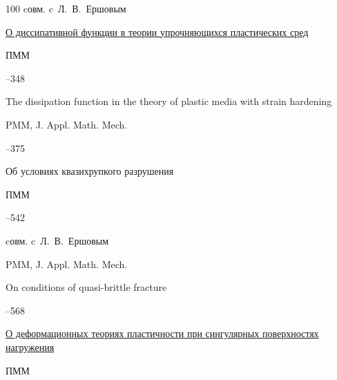 \begin{thebibliography}{100}
\miscnote cовм. c~Л.~В.~Ершовым




\paper \href{https://zbmath.org/?q=an:0152.43402}{О диссипативной функции в теории упрочняющихся пластических сред}

\jour ПММ




–348


\transl


\paper The dissipation function in the theory of plastic media with strain hardening

\jour PMM, J. Appl. Math. Mech. 


--375 








\paper  Об условиях квазихрупкого разрушения 

\jour ПММ




–542

\miscnote cовм. c~Л.~В.~Ершовым

\transl

\jour PMM, J. Appl. Math. Mech. 



\paper On conditions of quasi-brittle fracture

--568







\paper  \href{https://zbmath.org/?q=an:0176.26001}{О деформационных теориях пластичности при сингулярных поверхностях нагружения}

\jour ПММ


\end{thebibliography}
